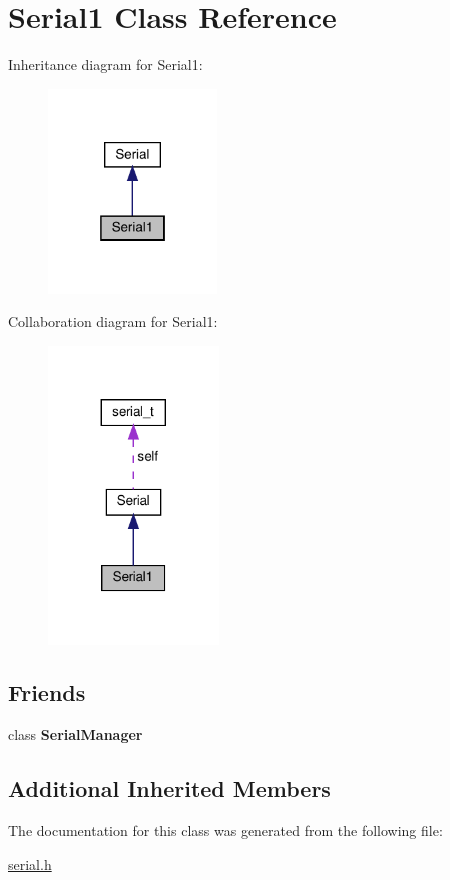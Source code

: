 \hypertarget{classSerial1}{}\section{Serial1 Class Reference}
\label{classSerial1}


Inheritance diagram for Serial1\+:\nopagebreak
\begin{figure}[H]
\begin{center}
\leavevmode
\includegraphics[width=127pt]{classSerial1__inherit__graph}
\end{center}
\end{figure}


Collaboration diagram for Serial1\+:\nopagebreak
\begin{figure}[H]
\begin{center}
\leavevmode
\includegraphics[width=128pt]{classSerial1__coll__graph}
\end{center}
\end{figure}
\subsection*{Friends}
\begin{DoxyCompactItemize}
\item 
\mbox{\label{classSerial1_ae711712f6bc003a5d1156a409a19941b}} 
class {\bfseries Serial\+Manager}
\end{DoxyCompactItemize}
\subsection*{Additional Inherited Members}


The documentation for this class was generated from the following file\+:\begin{DoxyCompactItemize}
\item 
\hyperlink{serial_8h}{serial.\+h}\end{DoxyCompactItemize}
